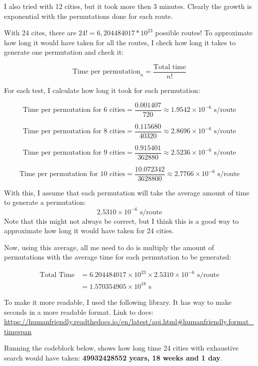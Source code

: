 \documentclass{article}
\begin{document}
    I also tried with 12 cities, but it took more then 3 minutes. Clearly the growth is exponential with the permutations done for each route. 

    With 24 cites, there are $24! = 6,204484017*10^{23}$ possible routes!
    To approximate how long it would have taken for all the routes, I check how long it takes to generate one permutation and check it: 

    \[
    \text{Time per permutation}_n = \frac{\text{Total time}}{n!}
    \]

    For each test, I calculate how long it took for each permutation: 

    \[
    \text{Time per permutation for 6 cities} = \frac{0.001407}{720} \approx 1.9542 \times 10^{-6} \text{ s/route}
    \]

    \[
    \text{Time per permutation for 8 cities} = \frac{0.115680}{40320} \approx 2.8696 \times 10^{-6} \text{ s/route}
    \]

    \[
    \text{Time per permutation for 9 cities} = \frac{0.915401}{362880} \approx 2.5236 \times 10^{-6} \text{ s/route}
    \]

    \[
    \text{Time per permutation for 10 cities} = \frac{10.072342}{3628800} \approx 2.7766 \times 10^{-6} \text{ s/route}
    \]

    With this, I assume that each permutation will take the average amount of time to generate a permutation: \[2.5310\times10^{-6} \text{ s/route} \]
    Note that this might not always be correct, but I think this is a good way to approximate how long it would have taken for 24 cities. 

    Now, using this average, all me need to do is multiply the amount of permutations with the average time for each permutation to be generated: 

    \[
    \begin{aligned}
        \text{Total Time} &= 6.204484017 \times 10^{23} \times 2.5310\times10^{-6} \text{ s/route} \\
                          &= 1.570354905 \times 10^{18} \text{ s}
    \end{aligned}
    \]

    To make it more readable, I used the following library. 
    It has way to make seconds in a more readable format. Link to docs: 
    \url{https://humanfriendly.readthedocs.io/en/latest/api.html#humanfriendly.format_timespan}

    Running the codeblock below, shows how long time 24 cities with exhaustive search would have taken: \textbf{49932428552 years, 18 weeks and 1 day}.
        
\end{document}
